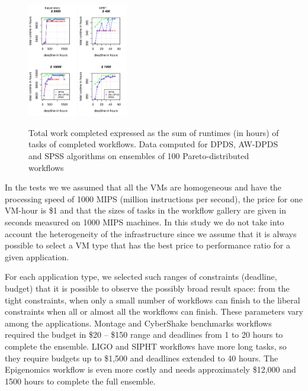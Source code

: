 \documentclass{sig-alternate}
\begin{document}
\begin{figure}[t]
\includegraphics[width=0.19\textwidth]{figures/pareto-size-GENOME-n-1000-8-dagh100-1500m0.pdf}
\includegraphics[width=0.19\textwidth]{figures/pareto-size-SIPHT-n-1000-8-dagh5-50m0.pdf}
\caption{ Total work completed expressed as the sum of runtimes (in hours) of
tasks of completed workflows. Data computed for DPDS, AW-DPDS and SPSS
algorithms on ensembles of 100 Pareto-distributed workflows}
\label{fig:total-time}
\end{figure}


In the tests we we assumed that all the VMs are homogeneous and have the
processing speed of 1000 MIPS (million instructions per second), the price for
one VM-hour is \$1 and that the sizes of tasks in the workflow gallery are given
in seconds measured on 1000 MIPS machines. In this study we do not take into
account the heterogeneity of the infrastructure since we assume that it is
always possible to select a VM type that has the best price to performance ratio
for a given application.

For each application type, we selected such ranges of constraints (deadline,
budget) that it is possible to observe the possibly broad result space: from the
tight constraints, when only a small number of workflows can finish to the
liberal constraints when all or almost all the workflows can finish. These
parameters vary among the applications. Montage and CyberShake benchmarks
workflows required the budget in \$20 -- \$150 range and deadlines from 1 to
20 hours to complete the ensemble. LIGO and SIPHT workflows have more long
tasks, so they require budgets up to \$1,500 and deadlines extended to 40
hours. The Epigenomics workflow is even more costly and needs approximately \$12,000
and 1500 hours to complete the full ensemble.
\end{document}
